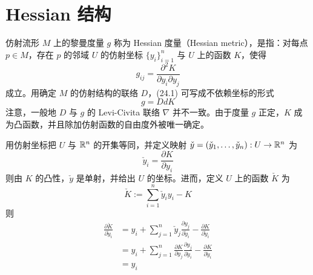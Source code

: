 
\section{Hessian 结构}

仿射流形 $M$ 上的黎曼度量 $g$ 称为 Hessian 度量（Hessian metric），是指：对每点 $p \in M$，存在 $p$ 的邻域 $U$ 的仿射坐标 $\{y_i\}_{i=1}^{n}$ 与 $U$ 上的函数 $K$，使得
\begin{equation}
g_{ij} = \frac{\partial^{2}K}{\partial y_i\partial y_j} \tag{24.1}
\end{equation}
成立。用确定 $M$ 的仿射结构的联络 $D$，(24.1) 可写成不依赖坐标的形式
\begin{equation}
g = DdK \tag{24.2}
\end{equation}
注意，一般地 $D$ 与 $g$ 的 Levi-Civita 联络 $\nabla$ 并不一致。由于度量 $g$ 正定，$K$ 成为凸函数，并且除加仿射函数的自由度外被唯一确定。

用仿射坐标把 $U$ 与 $\mathbb{R}^{n}$ 的开集等同，并定义映射 $\check y = (\check y_1, \dots, \check y_n) : U \to \mathbb{R}^{n}$ 为
\begin{equation}
\check y_i = \frac{\partial K}{\partial y_i} \tag{24.3}
\end{equation}
则由 $K$ 的凸性，$\check y$ 是单射，并给出 $U$ 的坐标。进而，定义 $U$ 上的函数 $\check K$ 为
\begin{equation}
\check K := \sum_{i=1}^{n}\check y_i y_i - K \tag{24.4}
\end{equation}
则
\begin{align}
\frac{\partial\check K}{\partial\check y_i} &= y_i + \sum_{j=1}^{n}\check y_j\frac{\partial y_j}{\partial\check y_i} - \frac{\partial K}{\partial\check y_i} \tag{24.5}\\
&= y_i + \sum_{j=1}^{n}\frac{\partial K}{\partial y_j}\frac{\partial y_j}{\partial\check y_i} - \frac{\partial K}{\partial\check y_i} \tag{24.6}\\
&= y_i \tag{24.7}
\end{align}


